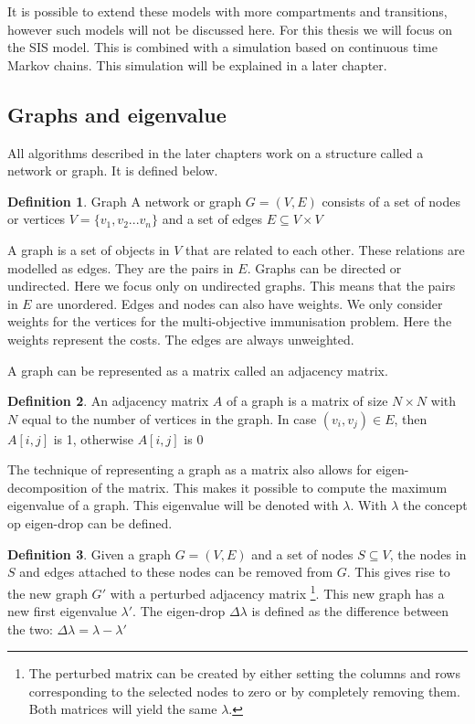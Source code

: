 \documentclass[11pt]{article}
\theoremstyle{definition}
\newtheorem{definition}{Definition}
\begin{document}
It is possible to extend these models with more compartments and transitions, however such models will not be discussed here. For this thesis we will focus on the SIS model. This is combined with a simulation based on continuous time Markov chains. This simulation will be explained in a later chapter.


\subsection{Graphs and eigenvalue}

All algorithms described in the later chapters work on a structure called a network or graph. It is defined below.

\theoremstyle{definition}
\begin{definition}{Graph}
A network or graph $G=(V,E)$ consists of a set of nodes or vertices $V = \{v_1, v_2 ... v_n\}$ and a set of edges $E \subseteq V \times V$
\end{definition}

A graph is a set of objects in $V$ that are related to each other. These relations are modelled as edges. They are the pairs in $E$. Graphs can be directed or undirected. Here we focus only on undirected graphs. This means that the pairs in $E$ are unordered. Edges and nodes can also have weights. We only consider weights for the vertices for the multi-objective immunisation problem. Here the weights represent the costs. The edges are always unweighted.

A graph can be represented as a matrix called an adjacency matrix.

\begin{definition} An adjacency matrix $A$ of a graph is a matrix of size $N \times N$ with $N$ equal to the number of vertices in the graph. In case $(v_i, v_j) \in E$, then $A[i,j]$ is 1, otherwise $A[i,j]$ is 0
\end{definition}

The technique of representing a graph as a matrix also allows for eigen-decomposition of the matrix. This makes it possible to compute the maximum eigenvalue of a graph. This eigenvalue will be denoted with $\lambda$. With $\lambda$ the concept op eigen-drop can be defined.

\begin{definition}
Given a graph $G=(V,E)$ and a set of nodes $S \subseteq V$, the nodes in $S$ and edges attached to these nodes can be removed from $G$. This gives rise to the new graph $G'$ with a perturbed adjacency matrix \footnote{The perturbed matrix can be created by either setting the columns and rows corresponding to the selected nodes to zero or by completely removing them. Both matrices will yield the same $\lambda$.}. This new graph has a new first eigenvalue $\lambda'$. The eigen-drop $\Delta\lambda$ is defined as the difference between the two: $\Delta\lambda = \lambda - \lambda'$
\end{definition}
\end{document}
